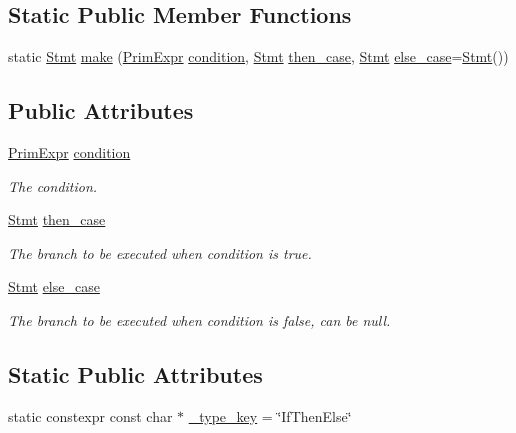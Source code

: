 \subsection*{Static Public Member Functions}
\begin{DoxyCompactItemize}
\item 
static \hyperlink{classtvm_1_1tir_1_1Stmt}{Stmt} \hyperlink{classtvm_1_1tir_1_1IfThenElseNode_aca48e5a0fcdcb9e2fb98bab24103a288}{make} (\hyperlink{classtvm_1_1PrimExpr}{Prim\+Expr} \hyperlink{classtvm_1_1tir_1_1IfThenElseNode_a635ac3bf9c574d2022d58bc305d36758}{condition}, \hyperlink{classtvm_1_1tir_1_1Stmt}{Stmt} \hyperlink{classtvm_1_1tir_1_1IfThenElseNode_ae7245cad13c62b608897f8c7ba70b6f6}{then\+\_\+case}, \hyperlink{classtvm_1_1tir_1_1Stmt}{Stmt} \hyperlink{classtvm_1_1tir_1_1IfThenElseNode_a301cd38fe44e590852d34849df59ce21}{else\+\_\+case}=\hyperlink{classtvm_1_1tir_1_1Stmt}{Stmt}())
\end{DoxyCompactItemize}
\subsection*{Public Attributes}
\begin{DoxyCompactItemize}
\item 
\hyperlink{classtvm_1_1PrimExpr}{Prim\+Expr} \hyperlink{classtvm_1_1tir_1_1IfThenElseNode_a635ac3bf9c574d2022d58bc305d36758}{condition}
\begin{DoxyCompactList}\small\item\em The condition. \end{DoxyCompactList}\item 
\hyperlink{classtvm_1_1tir_1_1Stmt}{Stmt} \hyperlink{classtvm_1_1tir_1_1IfThenElseNode_ae7245cad13c62b608897f8c7ba70b6f6}{then\+\_\+case}
\begin{DoxyCompactList}\small\item\em The branch to be executed when condition is true. \end{DoxyCompactList}\item 
\hyperlink{classtvm_1_1tir_1_1Stmt}{Stmt} \hyperlink{classtvm_1_1tir_1_1IfThenElseNode_a301cd38fe44e590852d34849df59ce21}{else\+\_\+case}
\begin{DoxyCompactList}\small\item\em The branch to be executed when condition is false, can be null. \end{DoxyCompactList}\end{DoxyCompactItemize}
\subsection*{Static Public Attributes}
\begin{DoxyCompactItemize}
\item 
static constexpr const char $\ast$ \hyperlink{classtvm_1_1tir_1_1IfThenElseNode_ac8c921f577880e0c60ed93d3ae3654db}{\+\_\+type\+\_\+key} = \char`\"{}If\+Then\+Else\char`\"{}
\end{DoxyCompactItemize}


